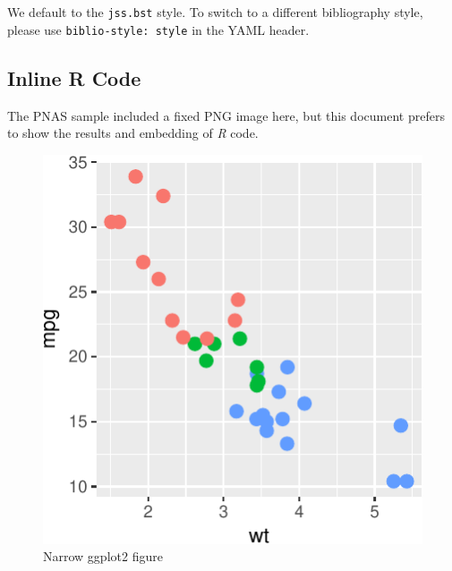 \documentclass[9pt,twocolumn,twoside,printwatermark=true]{pinp}
\begin{document}
We default to the \texttt{jss.bst} style. To switch to a different
bibliography style, please use \texttt{biblio-style:\ style} in the YAML
header.

\hypertarget{inline-r-code}{%
\subsection{Inline R Code}\label{inline-r-code}}

The PNAS sample included a fixed PNG image here, but this document
prefers to show the results and embedding of \emph{R} code.

\begin{Shaded}
\begin{Highlighting}[]
\OperatorTok{+}
\StringTok{    }\NormalTok{(}\NormalTok{, }\NormalTok{(}\OperatorTok{+}
\StringTok{    }\NormalTok{(}\NormalTok{)}
\end{Highlighting}
\end{Shaded}

\begin{figure}

{\centering \includegraphics{skeleton_files/figure-latex/figex-1} 

}

\caption{Narrow ggplot2 figure}\label{fig:figex}
\end{figure}
\end{document}
